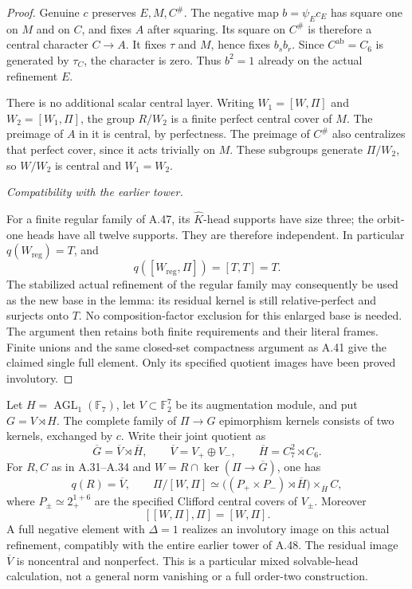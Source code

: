 \begin{proof}
Genuine \(c\) preserves \(E,M,C^\#\).
The negative map \(b=\psi_Ec_E\) has square
one on \(M\) and on \(C\), and fixes \(A\)
after squaring. Its square on \(C^\#\)
is therefore a central character \(C\to A\).
It fixes \(\tau\) and \(M\), hence fixes
\(b_sb_r\). Since \(C^{\mathrm{ab}}=C_6\)
is generated by \(\tau_C\), the character
is zero. Thus \(b^2=1\) already on the
actual refinement \(E\).

There is no additional scalar central layer.
Writing \(W_1=[W,\Pi]\) and
\(W_2=[W_1,\Pi]\), the group \(R/W_2\)
is a finite perfect central cover of \(M\).
The preimage of \(A\) in it is central,
by perfectness. The preimage of \(C^\#\)
also centralizes that perfect cover, since
it acts trivially on \(M\). These subgroups
generate \(\Pi/W_2\), so \(W/W_2\) is
central and \(W_1=W_2\).

\emph{Compatibility with the earlier tower.}\par
For a finite regular family of A.47, its
\(\widehat K\)-head supports have size three;
the orbit-one heads have all twelve supports.
They are therefore independent. In particular
\(q(W_{\mathrm{reg}})=T\), and
\[
 q([W_{\mathrm{reg}},\Pi])=[T,T]=T.
\]
The stabilized actual refinement of the
regular family may consequently be used
as the new base in the lemma: its residual
kernel is still relative-perfect and
surjects onto \(T\). No composition-factor
exclusion for this enlarged base is needed.
The argument then retains both finite
requirements and their literal frames.
Finite unions and the same closed-set
compactness argument as A.41 give the
claimed single full element. Only its
specified quotient images have been
proved involutory.
\end{proof}

Let \(H=\operatorname{AGL}_1(\mathbb F_7)\), let
\(V\subset\mathbb F_2^7\) be its augmentation module,
and put \(G=V\rtimes H\). The complete family of
\(\Pi\to G\) epimorphism kernels consists of two
kernels, exchanged by \(c\). Write their joint
quotient as
\[
 \overline G=\overline V\rtimes\overline H,
 \qquad \overline V=V_+\oplus V_-,
 \qquad \overline H=C_7^2\rtimes C_6.
\]
For \(R,C\) as in A.31--A.34 and
\(W=R\cap\ker(\Pi\to\overline G)\), one has
\[
 q(R)=\overline V,
 \qquad
 \Pi/[W,\Pi]
   \simeq\bigl((P_+\times P_-)\rtimes\overline H\bigr)
                       \times_{\overline H}C,
 \tag{A.49.1}
\]
where \(P_\pm\simeq2_+^{1+6}\) are the specified
Clifford central covers of \(V_\pm\). Moreover
\[
                       [[W,\Pi],\Pi]=[W,\Pi].
 \tag{A.49.2}
\]
A full negative element with \(\Delta=1\) realizes
an involutory image on this actual refinement,
compatibly with the entire earlier tower of A.48.
The residual image \(\overline V\) is noncentral
and nonperfect. This is a particular mixed
solvable-head calculation, not a general norm
vanishing or a full order-two construction.

